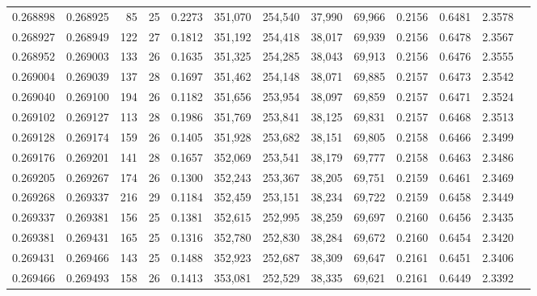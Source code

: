 \begin{tabular}{rrrrrrrrrrrrr}
0.268898 & 0.268925 &    85 &  25 &                                     0.2273 & 351,070 & 254,540 &  37,990 &  69,966 & 0.2156 & 0.6481 & 2.3578 \\
0.268927 & 0.268949 &   122 &  27 &                                     0.1812 & 351,192 & 254,418 &  38,017 &  69,939 & 0.2156 & 0.6478 & 2.3567 \\
0.268952 & 0.269003 &   133 &  26 &                                     0.1635 & 351,325 & 254,285 &  38,043 &  69,913 & 0.2156 & 0.6476 & 2.3555 \\
0.269004 & 0.269039 &   137 &  28 &                                     0.1697 & 351,462 & 254,148 &  38,071 &  69,885 & 0.2157 & 0.6473 & 2.3542 \\
0.269040 & 0.269100 &   194 &  26 &                                     0.1182 & 351,656 & 253,954 &  38,097 &  69,859 & 0.2157 & 0.6471 & 2.3524 \\
0.269102 & 0.269127 &   113 &  28 &                                     0.1986 & 351,769 & 253,841 &  38,125 &  69,831 & 0.2157 & 0.6468 & 2.3513 \\
0.269128 & 0.269174 &   159 &  26 &                                     0.1405 & 351,928 & 253,682 &  38,151 &  69,805 & 0.2158 & 0.6466 & 2.3499 \\
0.269176 & 0.269201 &   141 &  28 &                                     0.1657 & 352,069 & 253,541 &  38,179 &  69,777 & 0.2158 & 0.6463 & 2.3486 \\
0.269205 & 0.269267 &   174 &  26 &                                     0.1300 & 352,243 & 253,367 &  38,205 &  69,751 & 0.2159 & 0.6461 & 2.3469 \\
0.269268 & 0.269337 &   216 &  29 &                                     0.1184 & 352,459 & 253,151 &  38,234 &  69,722 & 0.2159 & 0.6458 & 2.3449 \\
0.269337 & 0.269381 &   156 &  25 &                                     0.1381 & 352,615 & 252,995 &  38,259 &  69,697 & 0.2160 & 0.6456 & 2.3435 \\
0.269381 & 0.269431 &   165 &  25 &                                     0.1316 & 352,780 & 252,830 &  38,284 &  69,672 & 0.2160 & 0.6454 & 2.3420 \\
0.269431 & 0.269466 &   143 &  25 &                                     0.1488 & 352,923 & 252,687 &  38,309 &  69,647 & 0.2161 & 0.6451 & 2.3406 \\
0.269466 & 0.269493 &   158 &  26 &                                     0.1413 & 353,081 & 252,529 &  38,335 &  69,621 & 0.2161 & 0.6449 & 2.3392 \\

\end{tabular}
